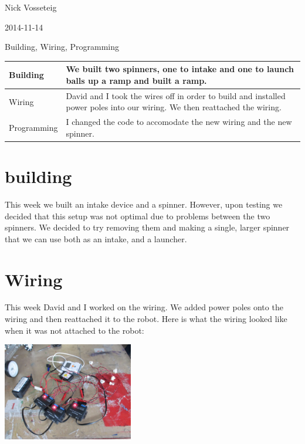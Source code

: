 Nick Vosseteig

2014-11-14

Building, Wiring, Programming

\begin{tabular}{|p{5cm}|p{5cm}|}
 \hline
 Building&
We built two spinners, one to intake and one to launch balls up a ramp and built a ramp.
 \\
 \hline
Wiring&
David and I took the wires off in order to build and installed power poles into our wiring. We then reattached the wiring.
 \\
 \hline
Programming&
I changed the code to accomodate the new wiring and the new spinner.
 \\
 \hline
\end{tabular}

\section*{building}
This week we built an intake device and a spinner. However, upon testing we decided that this setup was not optimal due to problems between the two spinners. We decided to try removing them and making a single, larger spinner that we can use both as an intake, and a launcher.
\section*{Wiring}
This week David and I worked on the wiring. We added power poles onto the wiring and then reattached it to the robot. Here is what the wiring looked like when it was not attached to the robot:
\begin{center}
 \includegraphics[width=215px]{./Entries/Images/wiring1.jpg}
\end{center}
